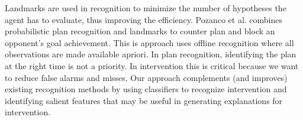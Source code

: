\documentclass[letterpaper]{article}
\theoremstyle{plain}
\begin{document}
Landmarks are used in recognition to minimize the number of hypotheses the agent has to evaluate, thus improving the efficiency. Pozanco et al.  combines probabilistic plan recognition and landmarks to counter plan and block an opponent's goal achievement. This is approach uses offline recognition where all observations are made available apriori. In plan recognition, identifying the plan at the right time is not a priority. In intervention this is critical because we want to reduce false alarms and misses. Our approach complements (and improves) existing recognition methods by using classifiers to recognize intervention and identifying salient features that may be useful in generating explanations for intervention.

\end{document}
